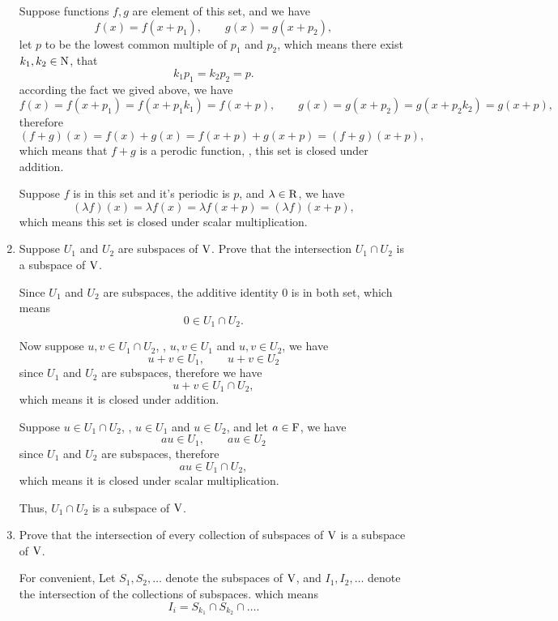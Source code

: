 \begin{enumerate}
\begin{solution}
            Suppose functions $f, g$ are element of this set, and we have 
            \[ f(x) = f(x+p_1), \qquad g(x) = g(x+p_2) ,\]
            let $p$ to be the lowest common multiple of $p_1$ and $p_2$, which means there exist $k_1, k_2 \in \mathrm{N}$, that 
            \[ k_1p_1 = k_2p_2 = p.\]
            according the fact we gived above, we have
            \[ f(x) = f(x+p_1) = f(x+p_1k_1) = f(x+p), \qquad g(x) = g(x+p_2) = g(x+p_2k_2) = g(x+p),\]
            therefore 
            \[ (f+g)(x) = f(x) + g(x) = f(x+p) + g(x+p) = (f+g)(x+p) ,\]
            which means that $f+g$ is a perodic function, \ie, this set is closed under addition.

            Suppose $f$ is in this set and it's periodic is $p$, and $\lambda \in \mathrm{R}$, we have 
            \[ (\lambda f)(x) = \lambda f(x) = \lambda f(x+p) = (\lambda f) (x+p) ,\]
            which means this set is closed under scalar multiplication.
        \end{solution}
    \item Suppose $U_1$ and $U_2$ are subspaces of $\mathrm{V}$. Prove that the intersection $U_1 \cap U_2$ is 
        a subspace of $\mathrm{V}$.
        \begin{solution}
            Since $U_1$ and $U_2$ are subspaces, the additive identity $0$ is in both set, which means 
            \[ 0 \in U_1 \cap U_2 .\]

            Now suppose $u, v \in U_1 \cap U_2$, \ie, $u,v \in U_1$ and $u,v \in U_2$,
            we have 
            \[ u+v \in U_1, \qquad u+v \in U_2\]
            since $U_1$ and $U_2$ are subspaces, therefore we have 
            \[ u+v \in U_1 \cap U_2 ,\]
            which means it is closed under addition.

            Suppose $u \in U_1 \cap U_2$, \ie, $u \in U_1$ and $u \in U_2$, and let $a \in \mathrm{F}$,
            we have 
            \[ au \in U_1, \qquad au \in U_2 \]
            since $U_1$ and $U_2$ are subspaces, therefore 
            \[ au \in U_1 \cap U_2 ,\]
            which means it is closed under scalar multiplication.

            Thus, $U_1 \cap U_2$ is a subspace of $\mathrm{V}$.
        \end{solution}
    \item Prove that the intersection of every collection of subspaces of $\mathrm{V}$ is a subspace of $\mathrm{V}$.
        \begin{solution}
            For convenient, Let $S_1, S_2, \ldots$ denote the subspaces of $\mathrm{V}$, and $I_1, I_2, \ldots$ 
            denote the intersection of the collections of subspaces. which means 
            \[ I_i = S_{k_1} \cap S_{k_2} \cap \dots .\]


\end{solution}
\end{enumerate}
